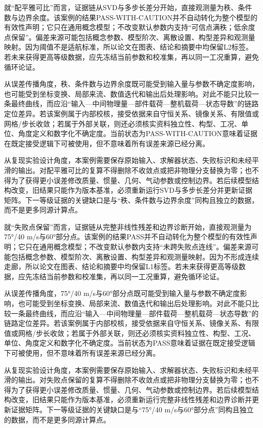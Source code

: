 \documentclass[UTF8,12pt,openany]{ctexbook}
\begin{document}
就“配平雅可比”而言，证据链从SVD与多步长差分开始，直接观测量为秩、条件数与边界余度。该案例的结果PASS-WITH-CAUTION并不自动转化为整个模型的有效性声明；它只在通用概念模型；不改变默认参数内支持“可信点满秩；低余度点保留”。偏差来源可能包括概念参数、模型阶次、离散设置、构型差异和观测量映射。因为阈值不是适航标准，所以论文在图表、结论和摘要中均保留L2标签。若未来获得更高等级数据，应先冻结当前参数和校准集，再以同一工况重算，避免循环论证。

从误差传播角度，秩、条件数与边界余度既可能受到输入量与参数不确定度影响，也可能受到坐标变换、局部来流、数值迭代和输出后处理影响。对此不能只比较一条最终曲线，而应沿“输入—中间物理量—部件载荷—整机载荷—状态导数”的链路定位差异。若该案例属于内部校核，接受依据来自守恒关系、镜像关系、有限值或网格/步长收敛；若属于外部关联，则还必须核实资料独立性、构型、工况、单位、角度定义和数字化不确定度。当前状态为PASS-WITH-CAUTION意味着证据在既定接受逻辑下可被使用，但不意味着所有误差来源已经分离。

从复现实验设计角度，本案例需要保存原始输入、求解器状态、失败标识和未经平滑的输出。对配平雅可比的复算不得删除不收敛点或把非物理分支替换为零；也不得为了获得更小误差修改质量、惯量、几何、气动参数或控制边界。若后续模型结构改变，旧结果只能作为版本基准，必须重新运行SVD与多步长差分并更新证据矩阵。下一等级证据的关键缺口是与“秩、条件数与边界余度”同构且独立的数据，而不是更多同源计算点。

就“失败点保留”而言，证据链从完整非线性残差和边界诊断开始，直接观测量为75°/40 m/s与60°部分点。该案例的结果PASS并不自动转化为整个模型的有效性声明；它只在通用概念模型；不改变默认参数内支持“未跨失败点连线”。偏差来源可能包括概念参数、模型阶次、离散设置、构型差异和观测量映射。因为不形成连续走廊，所以论文在图表、结论和摘要中均保留L1标签。若未来获得更高等级数据，应先冻结当前参数和校准集，再以同一工况重算，避免循环论证。

从误差传播角度，75°/40 m/s与60°部分点既可能受到输入量与参数不确定度影响，也可能受到坐标变换、局部来流、数值迭代和输出后处理影响。对此不能只比较一条最终曲线，而应沿“输入—中间物理量—部件载荷—整机载荷—状态导数”的链路定位差异。若该案例属于内部校核，接受依据来自守恒关系、镜像关系、有限值或网格/步长收敛；若属于外部关联，则还必须核实资料独立性、构型、工况、单位、角度定义和数字化不确定度。当前状态为PASS意味着证据在既定接受逻辑下可被使用，但不意味着所有误差来源已经分离。

从复现实验设计角度，本案例需要保存原始输入、求解器状态、失败标识和未经平滑的输出。对失败点保留的复算不得删除不收敛点或把非物理分支替换为零；也不得为了获得更小误差修改质量、惯量、几何、气动参数或控制边界。若后续模型结构改变，旧结果只能作为版本基准，必须重新运行完整非线性残差和边界诊断并更新证据矩阵。下一等级证据的关键缺口是与“75°/40 m/s与60°部分点”同构且独立的数据，而不是更多同源计算点。
\end{document}
